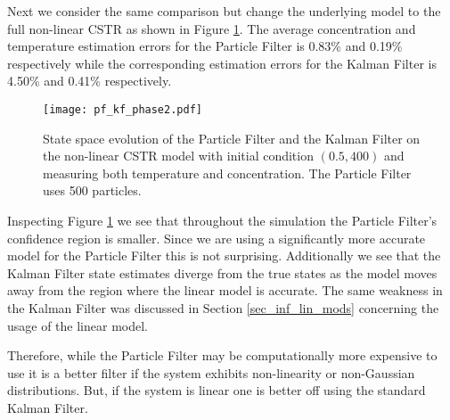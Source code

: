 Next we consider the same comparison but change the underlying model to the full non-linear CSTR as shown in Figure \ref{fig_pf_kf_phase2}. The average concentration and temperature estimation errors for the Particle Filter is 0.83\% and 0.19\% respectively while the corresponding estimation errors for the Kalman Filter is 4.50\% and 0.41\% respectively.
\begin{figure}[H] 
\centering
\texttt{[image: pf\_kf\_phase2.pdf]}
\caption{State space evolution of the Particle Filter and the Kalman Filter on the non-linear CSTR model with initial condition $(0.5, 400)$ and measuring both temperature and concentration. The Particle Filter uses 500 particles.}
\label{fig_pf_kf_phase2}
\end{figure}
Inspecting Figure \ref{fig_pf_kf_phase2} we see that throughout the simulation the Particle Filter's confidence region is smaller. Since we are using a significantly more accurate model for the Particle Filter this is not surprising. Additionally we see that the Kalman Filter state estimates diverge from the true states as the model moves away from the region where the linear model is accurate. The same weakness in the Kalman Filter was discussed in Section \ref{sec_inf_lin_mods} concerning the usage of the linear model.

Therefore, while the Particle Filter may be computationally more expensive to use it is a better filter if the system exhibits non-linearity or non-Gaussian distributions. But, if the system is linear one is better off using the standard Kalman Filter.